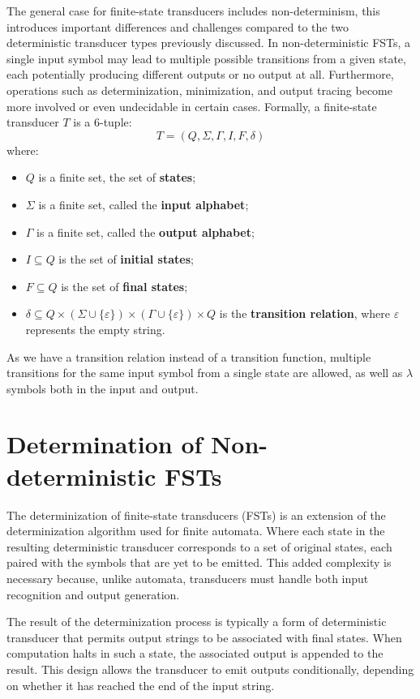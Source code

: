 The general case for finite-state transducers includes non-determinism, 
this introduces important differences and challenges compared to the two deterministic transducer types previously discussed. 
In non-deterministic FSTs, a single input symbol may lead to multiple possible transitions from a given state, 
each potentially producing different outputs or no output at all. 
Furthermore, operations such as determinization, minimization, and output tracing become more involved or even undecidable in certain cases. 
Formally, a finite-state transducer $T$ is a 6-tuple: \cite{finite_state_transducer}
\[
T = (Q, \Sigma, \Gamma, I, F, \delta)
\]
where:
\begin{itemize}
    \item $Q$ is a finite set, the set of \textbf{states};
    \item $\Sigma$ is a finite set, called the \textbf{input alphabet};
    \item $\Gamma$ is a finite set, called the \textbf{output alphabet};
    \item $I \subseteq Q$ is the set of \textbf{initial states};
    \item $F \subseteq Q$ is the set of \textbf{final states};
    \item $\delta \subseteq Q \times (\Sigma \cup \{\varepsilon\}) \times (\Gamma \cup \{\varepsilon\}) \times Q$ 
    is the \textbf{transition relation}, where $\varepsilon$ represents the empty string.
\end{itemize}

As we have a transition relation instead of a transition function, multiple transitions for the same input symbol from a single state are allowed,
as well as \(\lambda\) symbols both in the input and output.

\section*{Determination of Non-deterministic FSTs}

The determinization of finite-state transducers (FSTs) is an extension of the determinization algorithm used for finite automata. 
Where each state in the resulting deterministic transducer corresponds to a set of original states, 
each paired with the symbols that are yet to be emitted. This added complexity is necessary because, unlike automata, 
transducers must handle both input recognition and output generation.

The result of the determinization process is typically a form of deterministic transducer that permits output strings to be associated with final states. 
When computation halts in such a state, the associated output is appended to the result. 
This design allows the transducer to emit outputs conditionally, depending on whether it has reached the end of the input string.

